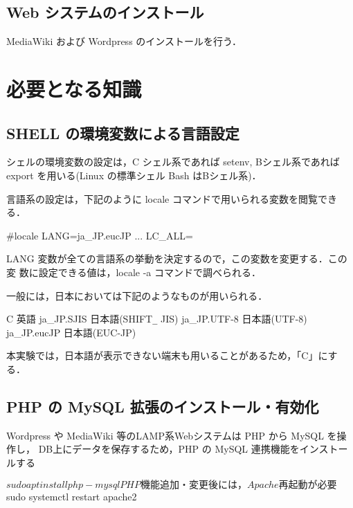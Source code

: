 \subsection*{Web システムのインストール}

MediaWiki および Wordpress のインストールを行う．


\section{必要となる知識}

\subsection{SHELL の環境変数による言語設定}

シェルの環境変数の設定は，C シェル系であれば setenv, Bシェル系であれば
export を用いる(Linux の標準シェル Bash はBシェル系)．

言語系の設定は，下記のように locale コマンドで用いられる変数を閲覧できる．

\begin{cli}
#locale
LANG=ja_JP.eucJP
  ...
LC_ALL=
\end{cli}

LANG 変数が全ての言語系の挙動を決定するので，この変数を変更する．この変
数に設定できる値は，locale -a コマンドで調べられる．

一般には，日本においては下記のようなものが用いられる．

\begin{cli}
C               英語
ja_JP.SJIS      日本語(SHIFT\verb+_+ JIS)
ja_JP.UTF-8     日本語(UTF-8)
ja_JP.eucJP     日本語(EUC-JP)
\end{cli}

本実験では，日本語が表示できない端末も用いることがあるため，「C」にする．



\subsection{PHP の MySQL 拡張のインストール・有効化}

Wordpress や MediaWiki 等のLAMP系Webシステムは PHP から MySQL を操作し，
DB上にデータを保存するため，PHP の MySQL 連携機能をインストールする

\begin{cli}
$ sudo apt install php-mysql

PHP機能追加・変更後には，Apache 再起動が必要

$ sudo systemctl restart apache2

\end{cli}

